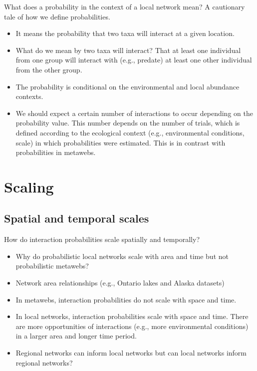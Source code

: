\documentclass[10pt,oneside]{article}
\begin{document}
What does a probability in the context of a local network mean? A
cautionary tale of how we define probabilities.

\begin{itemize}
\tightlist
\item
  It means the probability that two taxa will interact at a given
  location.
\item
  What do we mean by two taxa will interact? That at least one
  individual from one group will interact with (e.g., predate) at least
  one other individual from the other group.
\item
  The probability is conditional on the environmental and local
  abundance contexts.
\item
  We should expect a certain number of interactions to occur depending
  on the probability value. This number depends on the number of trials,
  which is defined according to the ecological context (e.g.,
  environmental conditions, scale) in which probabilities were
  estimated. This is in contrast with probabilities in metawebs.
\end{itemize}

\hypertarget{scaling}{%
\section{Scaling}\label{scaling}}

\hypertarget{spatial-and-temporal-scales}{%
\subsection{Spatial and temporal
scales}\label{spatial-and-temporal-scales}}

How do interaction probabilities scale spatially and temporally?

\begin{itemize}
\tightlist
\item
  Why do probabilistic local networks scale with area and time but not
  probabilistic metawebs?
\item
  Network area relationships (e.g., Ontario lakes and Alaska datasets)
\item
  In metawebs, interaction probabilities do not scale with space and
  time.
\item
  In local networks, interaction probabilities scale with space and
  time. There are more opportunities of interactions (e.g., more
  environmental conditions) in a larger area and longer time period.
\item
  Regional networks can inform local networks but can local networks
  inform regional networks?
\end{itemize}
\end{document}
